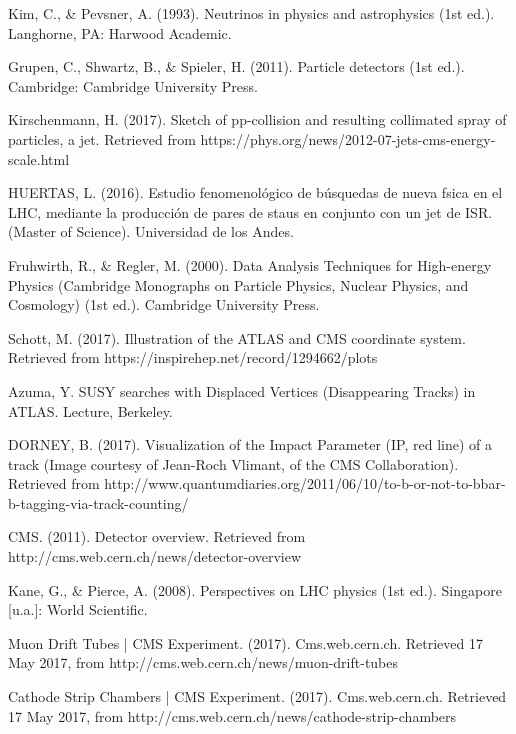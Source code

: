 \documentclass[11pt]{book}
\begin{document}
\begin{thebibliography}{10}
 Kim, C., \& Pevsner, A. (1993). Neutrinos in physics and astrophysics (1st ed.). Langhorne, PA: Harwood Academic.

 Grupen, C., Shwartz, B., \& Spieler, H. (2011). Particle detectors (1st ed.). Cambridge: Cambridge University Press.

 Kirschenmann, H. (2017). Sketch of pp-collision and resulting collimated spray of particles, a jet. Retrieved from https://phys.org/news/2012-07-jets-cms-energy-scale.html

 HUERTAS, L. (2016). Estudio fenomenológico de búsquedas de nueva fsica en el LHC, mediante la producción de pares de staus en conjunto con un jet de ISR. (Master of Science). Universidad de los Andes.

 Fruhwirth, R., \& Regler, M. (2000). Data Analysis Techniques for High-energy Physics (Cambridge Monographs on Particle Physics, Nuclear Physics, and Cosmology) (1st ed.). Cambridge University Press.

 Schott, M. (2017). Illustration of the ATLAS and CMS coordinate system. Retrieved from https://inspirehep.net/record/1294662/plots

  Azuma, Y. SUSY searches with Displaced Vertices (Disappearing Tracks) in ATLAS. Lecture, Berkeley.

 DORNEY, B. (2017). Visualization of the Impact Parameter (IP, red line) of a track (Image courtesy of Jean-Roch Vlimant, of the CMS Collaboration). Retrieved from http://www.quantumdiaries.org/2011/06/10/to-b-or-not-to-bbar-b-tagging-via-track-counting/

 CMS. (2011). Detector overview. Retrieved from http://cms.web.cern.ch/news/detector-overview

 Kane, G., \& Pierce, A. (2008). Perspectives on LHC physics (1st ed.). Singapore [u.a.]: World Scientific.

 Muon Drift Tubes | CMS Experiment. (2017). Cms.web.cern.ch. Retrieved 17 May 2017, from http://cms.web.cern.ch/news/muon-drift-tubes

 Cathode Strip Chambers | CMS Experiment. (2017). Cms.web.cern.ch. Retrieved 17 May 2017, from http://cms.web.cern.ch/news/cathode-strip-chambers


\end{thebibliography}
\end{document}
